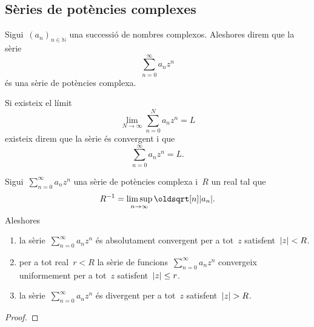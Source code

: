 \documentclass[../Apunts.tex]{subfiles}
\begin{document}
    \subsection{Sèries de potències complexes}
    \begin{definition}
        \label{def:sèrie de potències complexes}
        Sigui~\((a_{n})_{n\in\mathbb{N}}\) una successió de nombres complexos.
        Aleshores direm que la sèrie
        \[\sum_{n=0}^{\infty}a_{n}z^{n}\]
        és una sèrie de potències complexa.
        
        Si existeix el límit
        \[\lim_{N\to\infty}\sum_{n=0}^{N}a_{n}z^{n}=L\]
        existeix direm que la sèrie és convergent i que
        \[\sum_{n=0}^{\infty}a_{n}z^{n}=L.\]
        
    \end{definition}
    \begin{theorem}
        \label{thm:radi de convergència d'una sèrie de potències complexa}
        Sigui~\(\sum_{n=0}^{\infty}a_{n}z^{n}\) una sèrie de potències complexa
        i~\(R\) un real tal que
        \[R^{-1}=\limsup_{n\to\infty}\sqrt[n]{\modul{a_{n}}}.\]
        Aleshores
        \begin{enumerate}
            \item\label{thm:radi de convergència d'una sèrie de potències complexa:enum1}
                la sèrie~\(\sum_{n=0}^{\infty}a_{n}z^{n}\) és absolutament
                convergent per a tot~\(z\) satisfent~\(\modul{z}<R\).
            \item\label{thm:radi de convergència d'una sèrie de potències complexa:enum2}
                per a tot real~\(r<R\) la sèrie de
                funcions~\(\sum_{n=0}^{\infty}a_{n}z^{n}\) convergeix
                uniformement per a tot~\(z\) satisfent~\(\modul{z}\leq r\).
            \item\label{thm:radi de convergència d'una sèrie de potències complexa:enum3}
                la sèrie~\(\sum_{n=0}^{\infty}a_{n}z^{n}\) és divergent per a
                tot~\(z\) satisfent~\(\modul{z}>R\).
        \end{enumerate}
    \end{theorem}
    \begin{proof}
    \end{proof}
\end{document}
